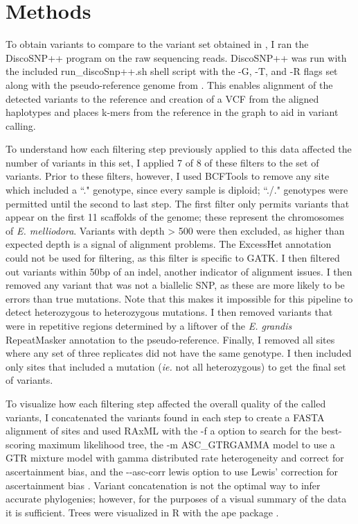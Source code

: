\section{Methods}

To obtain variants to compare to the variant set obtained in \textcite{orr_phylogenomic_2020}, I ran the DiscoSNP++ program on the raw sequencing reads. DiscoSNP++ was run with the included run\_discoSnp++.sh shell script with the -G, -T, and -R flags set along with the pseudo-reference genome from \textcite{orr_phylogenomic_2020}. This enables alignment of the detected variants to the reference and creation of a VCF from the aligned haplotypes and places k-mers from the reference in the graph to aid in variant calling.

To understand how each filtering step previously applied to this data affected the number of variants in this set, I applied 7 of 8 of these filters to the set of variants. Prior to these filters, however, I used BCFTools \parencite{li_statistical_2011} to remove any site which included a ``." genotype, since every sample is diploid; ``./." genotypes were permitted until the second to last step. The first filter only permits variants that appear on the first 11 scaffolds of the genome; these represent the chromosomes of \textit{E. melliodora}. Variants with depth > 500 were then excluded, as higher than expected depth is a signal of alignment problems. The ExcessHet annotation could not be used for filtering, as this filter is specific to GATK. I then filtered out variants within 50bp of an indel, another indicator of alignment issues. I then removed any variant that was not a biallelic SNP, as these are more likely to be errors than true mutations. Note that this makes it impossible for this pipeline to detect heterozygous to heterozygous mutations. I then removed variants that were in repetitive regions determined by a liftover of the \textit{E. grandis} RepeatMasker annotation \parencite{bartholome_high-resolution_2015} to the pseudo-reference. Finally, I removed all sites where any set of three replicates did not have the same genotype. I then included only sites that included a mutation (\textit{ie.} not all heterozygous) to get the final set of variants.

To visualize how each filtering step affected the overall quality of the called variants, I concatenated the variants found in each step to create a FASTA alignment of sites and used RAxML \parencite{stamatakis_raxml_2014} with the -f a option to search for the best-scoring maximum likelihood tree, the -m ASC\_GTRGAMMA model to use a GTR mixture model with gamma distributed rate heterogeneity and correct for ascertainment bias, and the -\phantom{}-asc-corr lewis option to use Lewis' correction for ascertainment bias \parencite{lewis_likelihood_2001}. Variant concatenation is not the optimal way to infer accurate phylogenies; however, for the purposes of a visual summary of the data it is sufficient. Trees were visualized in R \parencite{r_core_2020} with the ape package \parencite{paradis_ape_2019}.

